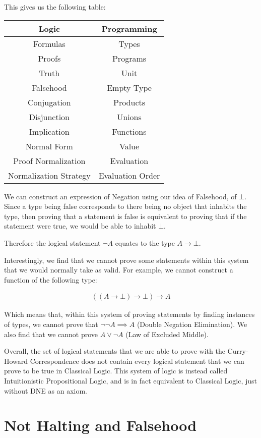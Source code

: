 \documentclass{article}
\newcommand{\inlineeq}[1]{
    \vspace{-2em}
    \begin{gather*}
    #1
    \end{gather*}
    \vspace{-2em}
}
\begin{document}
\newpage
This gives us the following table:

\begin{center}
\begin{tabular}{ c|c} \; 
 Logic & Programming \\
 \hline
 Formulas & Types \\
 Proofs & Programs \\
 Truth & Unit \\
 Falsehood & Empty Type \\
 Conjugation & Products \\
 Disjunction & Unions \\
 Implication & Functions \\
 Normal Form & Value \\
 Proof Normalization & Evaluation \\
 Normalization Strategy & Evaluation Order \\
\end{tabular}
\end{center}

We can construct an expression of Negation using our idea of Falsehood, of $\bot$. Since a type being false corresponds to there being no object that inhabits the type, then proving that a statement is false is equivalent to proving that if the statement were true, we would be able to inhabit $\bot$.

Therefore the logical statement $\lnot A$ equates to the type $A \to \bot$.

Interestingly, we find that we cannot prove some statements within this system that we would normally take as valid. For example, we cannot construct a function of the following type:

\inlineeq{((A \to \bot) \to \bot) \to A}

Which means that, within this system of proving statements by finding instances of types, we cannot prove that $\lnot \lnot A \implies A$ (Double Negation Elimination). We also find that we cannot prove $A \lor \lnot A$ (Law of Excluded Middle).

Overall, the set of logical statements that we are able to prove with the Curry-Howard Correspondence does not contain every logical statement that we can prove to be true in Classical Logic. This system of logic is instead called Intuitionistic Propositional Logic, and is in fact equivalent to Classical Logic, just without DNE as an axiom.

\newpage
\section{Not Halting and Falsehood}
\end{document}
